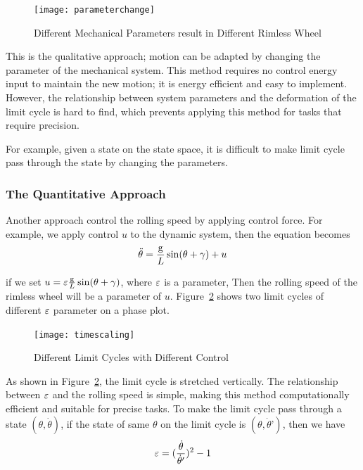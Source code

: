 \begin{figure}[!htbp]
  \begin{center}
     \texttt{[image: parameterchange]}
    \caption{Different Mechanical Parameters result in Different Rimless Wheel}
    \label{fig:morphyingrimlesss}  
  \end{center}
\end{figure}



This is the qualitative approach; motion can be adapted by changing the parameter of the mechanical system. 
This method  requires no control energy input to maintain the new motion; it is energy efficient and easy to implement. 
However, the relationship between system parameters and the deformation of the limit cycle is hard to find, which prevents applying this method for tasks that require precision. 

For example, given a state on the state space, it is difficult to make limit cycle pass through the state by changing the parameters.

\subsubsection*{The Quantitative Approach}

Another approach control the rolling speed by applying control force.
For example, we apply control $u$ to the dynamic system, then the equation becomes
\[
\ddot{\theta}=\frac{\mathrm{g}}{L}\sin(\theta+\gamma)+u
\]

if we set $u = \varepsilon\frac{\mathrm{g}}{L}\sin(\theta+\gamma)$, where $\varepsilon$ is a parameter,
Then the rolling speed of the rimless wheel will be a parameter of $u$.
Figure~\ref{fig:timescalingrimlesswheel} shows two limit cycles of different $\varepsilon$ parameter on a phase plot.
\begin{figure}[!htbp]
  \begin{center}
     \texttt{[image: timescaling]}
    \caption{Different Limit Cycles with Different Control}
    \label{fig:timescalingrimlesswheel}  
  \end{center}
\end{figure}

 As shown in Figure~\ref{fig:timescalingrimlesswheel}, the limit cycle is stretched vertically.
The relationship between $\varepsilon$ and the rolling speed is simple, making this method computationally efficient and suitable for precise tasks. To make the limit cycle pass through a state $(\theta, \dot{\theta})$, if the state of same $\theta$ on the limit cycle is $ (\theta,\dot{\theta}’)$, then we have 
\[
\varepsilon= (\frac{\dot{\theta}}{\dot{\theta}'})^2-1
\]

